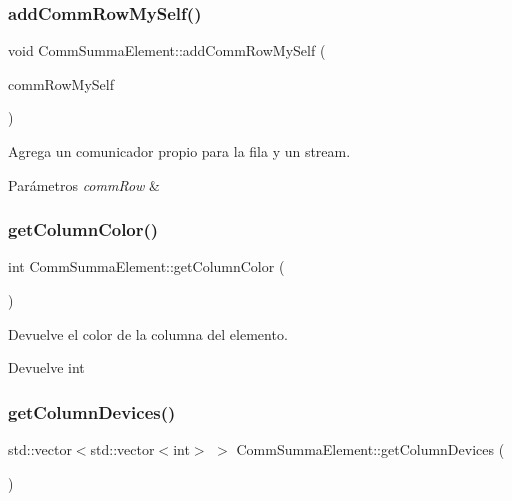 \subsubsection{\texorpdfstring{add\+Comm\+Row\+My\+Self()}{addCommRowMySelf()}}
{\footnotesize\ttfamily void Comm\+Summa\+Element\+::add\+Comm\+Row\+My\+Self (\begin{DoxyParamCaption}\item[{nccl\+Comm\+\_\+t}]{comm\+Row\+My\+Self }\end{DoxyParamCaption})}



Agrega un comunicador propio para la fila y un stream. 


\begin{DoxyParams}{Parámetros}
{\em comm\+Row} & \\
\hline
\end{DoxyParams}
\mbox{\label{classCommSummaElement_acdd065590e6a11a9cdd0d16034d9e7cf}} 
\subsubsection{\texorpdfstring{get\+Column\+Color()}{getColumnColor()}}
{\footnotesize\ttfamily int Comm\+Summa\+Element\+::get\+Column\+Color (\begin{DoxyParamCaption}{ }\end{DoxyParamCaption})}



Devuelve el color de la columna del elemento. 

\begin{DoxyReturn}{Devuelve}
int 
\end{DoxyReturn}
\mbox{\label{classCommSummaElement_a8b427d9631c71cb0be842c51a2afbca5}} 
\subsubsection{\texorpdfstring{get\+Column\+Devices()}{getColumnDevices()}}
{\footnotesize\ttfamily std\+::vector$<$std\+::vector$<$int$>$ $>$ Comm\+Summa\+Element\+::get\+Column\+Devices (\begin{DoxyParamCaption}{ }\end{DoxyParamCaption})}



